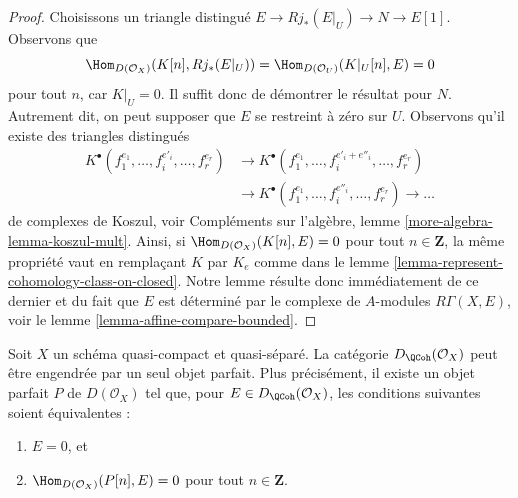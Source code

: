\begin{proof}
Choisissons un triangle distingué $E \to Rj_*(E|_U) \to N \to E[1]$.
Observons que
$$
\Hom_{D(\mathcal{O}_X)}(K[n], Rj_*(E|_U)) =
\Hom_{D(\mathcal{O}_U)}(K|_U[n], E) = 0
$$
pour tout $n$, car $K|_U = 0$. Il suffit donc de démontrer le résultat pour
$N$. Autrement dit, on peut supposer que $E$ se restreint à zéro sur $U$.
Observons qu'il existe des triangles distingués
$$
\begin{aligned}
K^\bullet(f_1^{e_1}, \ldots, f_i^{e'_i}, \ldots, f_r^{e_r}) &\to
K^\bullet(f_1^{e_1}, \ldots, f_i^{e'_i + e''_i}, \ldots, f_r^{e_r}) \\
{}&\to
K^\bullet(f_1^{e_1}, \ldots, f_i^{e''_i}, \ldots, f_r^{e_r}) \to \ldots
\end{aligned}
$$
de complexes de Koszul, voir
Compléments sur l'algèbre, lemme \ref{more-algebra-lemma-koszul-mult}.
Ainsi, si $\Hom_{D(\mathcal{O}_X)}(K[n], E) = 0$ pour tout $n \in \mathbf{Z}$,
la même propriété vaut en remplaçant $K$ par
$K_e$ comme dans le lemme \ref{lemma-represent-cohomology-class-on-closed}.
Notre lemme résulte donc immédiatement de ce dernier et du fait que $E$
est déterminé par le complexe de $A$-modules $R\Gamma(X, E)$, voir le
lemme \ref{lemma-affine-compare-bounded}.
\end{proof}

\begin{theorem}
\label{theorem-bondal-van-den-Bergh}
Soit $X$ un schéma quasi-compact et quasi-séparé. La catégorie
$D_\QCoh(\mathcal{O}_X)$ peut être engendrée par un seul
objet parfait. Plus précisément, il existe un objet parfait
$P$ de $D(\mathcal{O}_X)$ tel que, pour
$E \in D_\QCoh(\mathcal{O}_X)$, les conditions suivantes soient équivalentes :
\begin{enumerate}
\item $E = 0$, et
\item $\Hom_{D(\mathcal{O}_X)}(P[n], E) = 0$ pour tout $n \in \mathbf{Z}$.
\end{enumerate}
\end{theorem}

